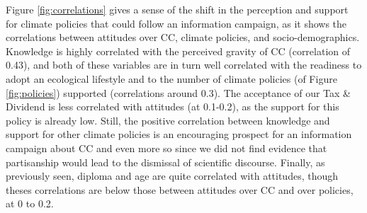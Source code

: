 \documentclass[english,5p,authoryear]{elsarticle}
\begin{document}

Figure \ref{fig:correlations} gives a sense of the shift in the perception and support for climate policies that could follow an information campaign, as it shows the correlations between attitudes over CC, climate policies, and socio-demographics. Knowledge is highly correlated with the perceived gravity of CC (correlation of 0.43), and both of these variables are in turn well correlated with the readiness to adopt an ecological lifestyle and to the number of climate policies (of Figure \ref{fig:policies}) supported (correlations around 0.3). The acceptance of our Tax \& Dividend is less correlated with attitudes (at 0.1-0.2), as the support for this policy is already low. Still, the positive correlation between knowledge and support for other climate policies is an encouraging prospect for an information campaign about CC and even more so since we did not find evidence that partisanship would lead to the dismissal of scientific discourse. Finally, as previously seen, diploma and age are quite correlated with attitudes, though theses correlations are below those between attitudes over CC and over policies, at 0 to 0.2. %
\end{document}
